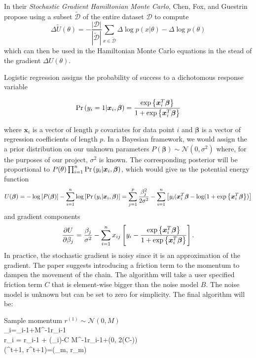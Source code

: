 In their \textit{Stochastic Gradient Hamiltonian Monte Carlo}, Chen, Fox, and Guestrin propose using a subset $\tilde{\mathcal{D}}$ of the entire dataset $\mathcal{D}$ to compute
\begin{equation*}
	\Delta\tilde{U}(\theta)=-\frac{|\mathcal{D}|}{|\tilde{\mathcal{D}}|}\sum_{x\in\tilde{\mathcal{D}}}\Delta\log p(x|\theta) - \Delta\log p(\theta)
\end{equation*}
which can then be used in the Hamiltonian Monte Carlo equations in the stead of the gradient $\Delta U(\theta)$.

Logistic regression assigns the probability of success to a dichotomous response variable

\begin{equation*}
	\mathrm{Pr}\left(y_i=1|\bm{x}_{i},\bm{\beta}\right)=\frac{\exp\left\lbrace\bm{x}_i^T\bm{\beta} \right\rbrace}{1+\exp\left\lbrace\bm{x}_i^T\bm{\beta} \right\rbrace}
\end{equation*}

where $\bm{x}_i$ is a vector of length $p$ covariates for data point $i$ and $\bm{\beta}$ is a vector of regression coefficients of length $p$. In a Bayesian framework, we would assign the a prior distribution on our unknown parameters $P(\bm{\beta})\sim\mathcal{N}(0, \sigma^2)$ where, for the purposes of our project, $\sigma^2$ is known. The corresponding posterior will be proportional to $P(\theta)\prod_{i=1}^n\mathrm{Pr}\left(y_i|\bm{x}_i,\bm{\beta}\right)$, which would give us the potential energy function
\begin{equation*}
U(\bm{\beta})=-\log\left[P(\bm{\beta})\right] - \sum_{i=1}^n\log\left[\mathrm{Pr}\left(y_i|\bm{x}_i,\bm{\beta}\right)\right]=\sum_{j=1}^p\frac{\beta_j^2}{2\sigma^2}-\sum_{i=1}^n\left[y_i(\bm{x}_i^T\bm{\beta}-\log(1+\exp\left\lbrace\bm{x}_i^T\bm{\beta} \right\rbrace)\right]
\end{equation*}
and gradient components
\begin{equation*}
\frac{\partial U}{\partial \beta_j}=\frac{\beta_j}{\sigma^2}-\sum_{i=1}^{n}x_{ij}\left[y_i-\frac{\exp\left\lbrace\bm{x}_i^T\bm{\beta} \right\rbrace}{1+\exp\left\lbrace\bm{x}_i^T\bm{\beta} \right\rbrace}\right]. 
\end{equation*}
In practice, the stochastic gradient is noisy since it is an approximation of the gradient. The paper suggests introducing a friction term to the momentum to dampen the movement of the chain. The algorithm will take a user specified friction term $C$ that is element-wise bigger than the noise model $B$. The noise model is unknown but can be set to zero for simplicity. The final algorithm will be:

\begin{algorithm}[H]
	 {
		Sample momentum $r^{(1)}\sim\mathcal{N}(0, M)$\\
		 {
			\theta_i=\theta_{i-1}+\epsilon M^{-1}r_{i-1}\\
			r_i = r_{i-1} + \epsilon \Delta{}(\theta_i)-\epsilon C M^{-1}r_{i-1}+(0, 2(C-)\epsilon)\\
		}
		(\theta^{t+1}, r^{t+1})=(\theta_m, r_m)\\
	}
\end{algorithm}
